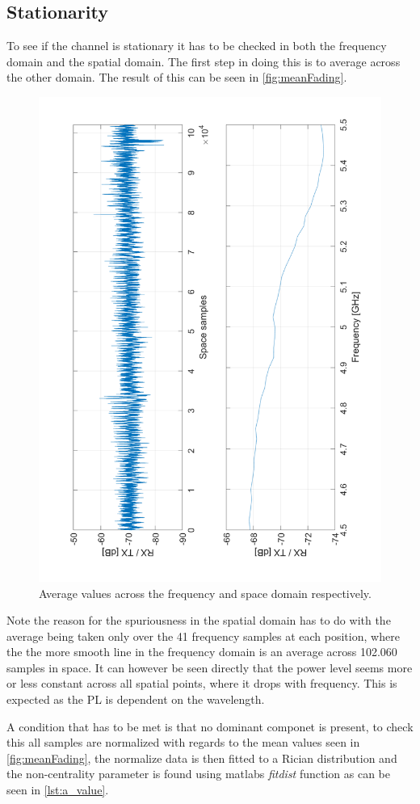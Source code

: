 \subsection{Stationarity}
To see if the channel is stationary it has to be checked in both the frequency domain and the spatial domain. The first step in doing this is to average across the other domain. The result of this can be seen in \autoref{fig:meanFading}. 


\begin{figure}[H]
\centering
\includegraphics[height = \textwidth, angle = -90]{figures/meanFading.pdf}
\caption{Average values across the frequency and space domain respectively.}
\label{fig:meanFading}
\end{figure}


Note the reason for the spuriousness in the spatial domain has to do with the average being taken only over the 41 frequency samples at each position, where the the more smooth line in the frequency domain is an average across 102.060 samples in space. It can however be seen directly that the power level seems more or less constant across all spatial points, where it drops with frequency. This is expected as the \gls{PL} is dependent on the wavelength.  

A condition that has to be met is that no dominant componet is present, to check this all samples are normalized with regards to the mean values seen in \autoref{fig:meanFading}, the normalize data is then fitted to a Rician distribution and the non-centrality parameter is found using matlabs \textit{fitdist} function as can be seen in \autoref{lst:a_value}. 

